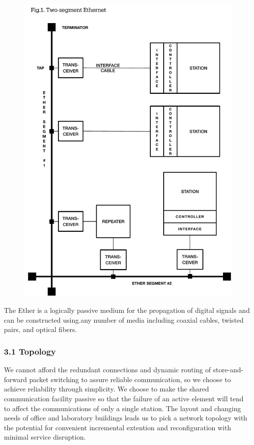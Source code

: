 \vspace{\fill} \pagebreak
\begin{figure}[h!]
\centering
  \includegraphics[trim =0mm 0mm 0mm 0mm, clip, width=\columnwidth ]{Figures/Omni-Figure-1.pdf} %
\end{figure}


 


The Ether is a logically passive medium for the propagation of digital signals and can be constructed using.any number of media including coaxial cables, twisted pairs, and optical fibers.


\subsubsection{3.1 Topology}
We cannot afford the redundant connections and dynamic routing of store-and-forward packet switching to assure reliable communication, so we choose to achieve reliability through simplicity. We choose to make the shared communication facility passive so that the failure of an active element will tend to affect the communications of only a single station. The layout and changing needs of office and laboratory buildings leads us to pick a network topology with the potential for convenient incremental extention and reconfiguration with minimal service disruption.

